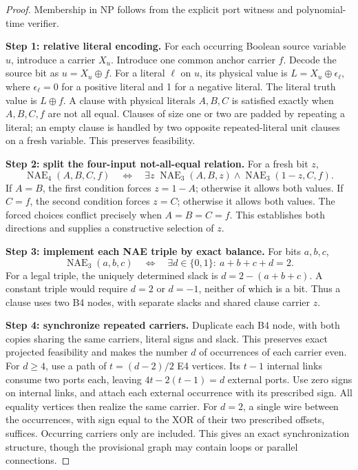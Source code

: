 \documentclass[11pt,letterpaper]{article}
\theoremstyle{definition}
\newcommand{\bits}{\{0,1\}}
\newcommand{\NAE}{\operatorname{NAE}}
\begin{document}
\begin{proof}
Membership in NP follows from the explicit port witness and polynomial-time verifier.

\textbf{Step 1: relative literal encoding.} For each occurring Boolean source variable \(u\), introduce a carrier \(X_u\). Introduce one common anchor carrier \(f\). Decode the source bit as \(u=X_u\oplus f\). For a literal \(\ell\) on \(u\), its physical value is \(L=X_u\oplus\epsilon_\ell\), where \(\epsilon_\ell=0\) for a positive literal and 1 for a negative literal. The literal truth value is \(L\oplus f\). A clause with physical literals \(A,B,C\) is satisfied exactly when \(A,B,C,f\) are not all equal. Clauses of size one or two are padded by repeating a literal; an empty clause is handled by two opposite repeated-literal unit clauses on a fresh variable. This preserves feasibility.

\textbf{Step 2: split the four-input not-all-equal relation.} For a fresh bit \(z\),
\begin{equation}\label{eq:nae}
 \NAE_4(A,B,C,f)\quad\Longleftrightarrow\quad
 \exists z\; \NAE_3(A,B,z)\land\NAE_3(1-z,C,f).
\end{equation}
If \(A=B\), the first condition forces \(z=1-A\); otherwise it allows both values. If \(C=f\), the second condition forces \(z=C\); otherwise it allows both values. The forced choices conflict precisely when \(A=B=C=f\). This establishes both directions and supplies a constructive selection of \(z\).

\textbf{Step 3: implement each NAE triple by exact balance.} For bits \(a,b,c\),
\begin{equation}\label{eq:slack}
 \NAE_3(a,b,c)\quad\Longleftrightarrow\quad
 \exists d\in\bits:\ a+b+c+d=2.
\end{equation}
For a legal triple, the uniquely determined slack is \(d=2-(a+b+c)\). A constant triple would require \(d=2\) or \(d=-1\), neither of which is a bit. Thus a clause uses two B4 nodes, with separate slacks and shared clause carrier \(z\).

\textbf{Step 4: synchronize repeated carriers.} Duplicate each B4 node, with both copies sharing the same carriers, literal signs and slack. This preserves exact projected feasibility and makes the number \(d\) of occurrences of each carrier even. For \(d\ge4\), use a path of \(t=(d-2)/2\) E4 vertices. Its \(t-1\) internal links consume two ports each, leaving \(4t-2(t-1)=d\) external ports. Use zero signs on internal links, and attach each external occurrence with its prescribed sign. All equality vertices then realize the same carrier. For \(d=2\), a single wire between the occurrences, with sign equal to the XOR of their two prescribed offsets, suffices. Occurring carriers only are included. This gives an exact synchronization structure, though the provisional graph may contain loops or parallel connections.


\end{proof}
\end{document}
